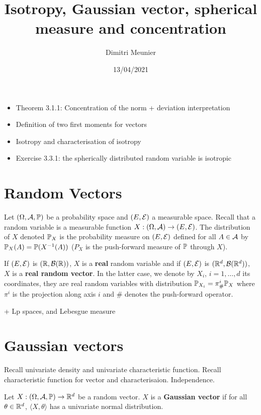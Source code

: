 \documentclass{article}
\title{Isotropy, Gaussian vector, spherical measure and concentration}
\author{Dimitri Meunier}
\date{13/04/2021}
\begin{document}
\maketitle

\begin{itemize}
\item Theorem 3.1.1: Concentration of the norm + deviation interpretation
\item Definition of two first moments for vectors
\item Isotropy and characterisation of isotropy
\item Exercise 3.3.1: the spherically distributed random variable is isotropic
\end{itemize}

\section{Random Vectors}

Let $(\Omega,\cA,\P)$ be a probability space and $(E,\cE)$ a measurable space.
Recall that a random variable is a measurable function $X:(\Omega,\cA) \to
(E,\cE)$. The distribution of $X$ denoted $\P_X$ is the probability measure on
$(E,\cE)$ defined for all $A \in \cA$ by $\P_X(A) = \P(X^{-1}(A))$ ($P_X$ is the
push-forward measure of $\P$ through $X$).

If $(E,\cE)$ is $(\R,\cB(\R))$, $X$ is a \textbf{real} random
variable and if $(E,\cE)$ is $(\Rd,\cB(\Rd))$, $X$ is a
\textbf{real random vector}. In the latter case, we denote by $X_i$,
$i=1,\ldots,d$ its coordinates, they are real random variables with distribution
$\P_{X_i} = \pi^i_{\#}\P_X$ where $\pi^i$ is the projection along axis $i$ and
$\#$ denotes the push-forward operator.

+ Lp spaces, and Lebesgue measure

\section{Gaussian vectors}

Recall univariate density and univariate characteristic function. Recall
characteristic function for vector and characterisaion. Independence. 

\begin{definition}
  Let $X:(\Omega,\cA,\P) \to \Rd$ be a random vector. $X$ is a \textbf{Gaussian
    vector} if for all $\theta \in \Rd$, $\langle X, \theta \rangle$ has a
  univariate normal distribution.
\end{definition}
\end{document}
